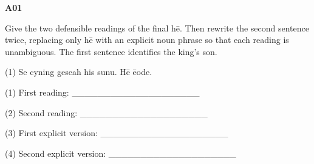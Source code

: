 \par\begin{minipage}{\linewidth}\raggedright
\textbf{A01}

Give the two defensible readings of the final hē. Then rewrite the second sentence twice, replacing only hē with an explicit noun phrase so that each reading is unambiguous. The first sentence identifies the king's son.

(1) Se cyning geseah his sunu. Hē ēode.

(1) First reading: \_\_\_\_\_\_\_\_\_\_\_\_\_\_\_\_\_\_\_\_

(2) Second reading: \_\_\_\_\_\_\_\_\_\_\_\_\_\_\_\_\_\_\_\_

(3) First explicit version: \_\_\_\_\_\_\_\_\_\_\_\_\_\_\_\_\_\_\_\_

(4) Second explicit version: \_\_\_\_\_\_\_\_\_\_\_\_\_\_\_\_\_\_\_\_

\end{minipage}\par\addvspace{4pt}

